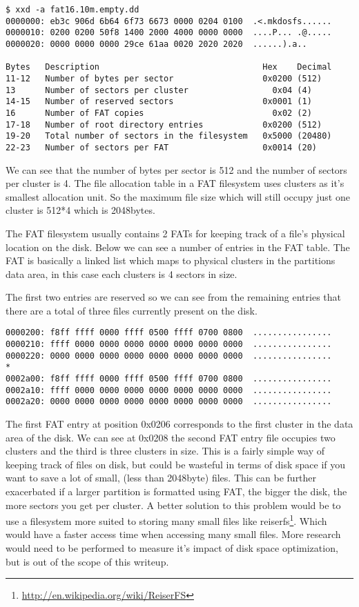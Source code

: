 \documentclass[a4paper,
    11pt,
    normalheadings,
    parindent,
    UKenglish,
    abstracton,
    ]{scrartcl}
\begin{document}
\begin{verbatim}
$ xxd -a fat16.10m.empty.dd
0000000: eb3c 906d 6b64 6f73 6673 0000 0204 0100  .<.mkdosfs......
0000010: 0200 0200 50f8 1400 2000 4000 0000 0000  ....P... .@.....
0000020: 0000 0000 0000 29ce 61aa 0020 2020 2020  ......).a..     

Bytes   Description                                 Hex    Decimal
11-12   Number of bytes per sector                  0x0200 (512)
13      Number of sectors per cluster                 0x04 (4)
14-15   Number of reserved sectors                  0x0001 (1)
16      Number of FAT copies                          0x02 (2)
17-18   Number of root directory entries            0x0200 (512)
19-20   Total number of sectors in the filesystem   0x5000 (20480)
22-23   Number of sectors per FAT                   0x0014 (20)
\end{verbatim}

We can see that the number of bytes per sector is 512 and the number of sectors per cluster is 4. The file allocation table in a FAT filesystem uses clusters as it's smallest allocation unit. So the maximum file size which will still occupy just one cluster is 512*4 which is 2048bytes.

The FAT filesystem usually contains 2 FATs for keeping track of a file's physical location on the disk. Below we can see a number of entries in the FAT table. The FAT is basically a linked list which maps to physical clusters in the partitions data area, in this case each clusters is 4 sectors in size.

The first two entries are reserved so we can see from the remaining entries that there are a total of three files currently present on the disk. 

\begin{verbatim}
0000200: f8ff ffff 0000 ffff 0500 ffff 0700 0800  ................
0000210: ffff 0000 0000 0000 0000 0000 0000 0000  ................
0000220: 0000 0000 0000 0000 0000 0000 0000 0000  ................
*
0002a00: f8ff ffff 0000 ffff 0500 ffff 0700 0800  ................
0002a10: ffff 0000 0000 0000 0000 0000 0000 0000  ................
0002a20: 0000 0000 0000 0000 0000 0000 0000 0000  ................
\end{verbatim}

The first FAT entry at position 0x0206 corresponds to the first cluster in the data area of the disk.  We can see at 0x0208 the second FAT entry file occupies two clusters and the third is three clusters in size. This is a fairly simple way of keeping track of files on disk, but could be wasteful in terms of disk space if you want to save a lot of small, (less than 2048byte) files. This can be further exacerbated if a larger partition is formatted using FAT, the bigger the disk, the more sectors you get per cluster. A better solution to this problem would be to use a filesystem more suited to storing many small files like reiserfs\footnote{\url{http://en.wikipedia.org/wiki/ReiserFS}}. Which would have a faster access time when accessing many small files. More research would need to be performed to measure it's impact of disk space optimization, but is out of the scope of this writeup.
\end{document}

